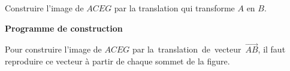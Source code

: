 \begin{methode*1}    
    \exercice
    Construire l'image de $ACEG$ par la translation qui transforme $A$ en $B$.
    \correction
    \begin{minipage}{0.45\linewidth}
        \begin{center}
        \end{center}
    \end{minipage}
    \begin{minipage}{0.55\linewidth}
        \textbf{Programme de construction}

        Pour construire l'image de $ACEG$ par \mbox{la translation de vecteur $\overrightarrow{AB}$}, il faut reproduire ce vecteur à partir de chaque sommet de la figure.
    \end{minipage}
    \begin{myBox}{}
        \creditInstrumentPoche
    \end{myBox}
\end{methode*1}
